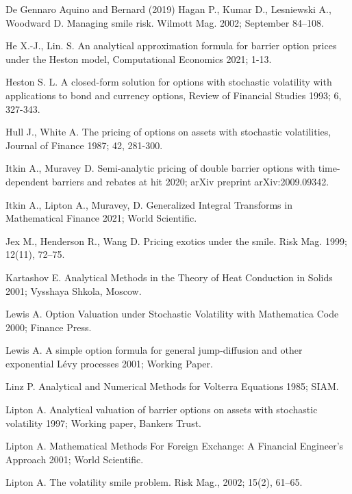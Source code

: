 \documentclass{article}
\begin{document}
\begin{thebibliography}{De Gennaro Aquino and Bernard (2019)}
 Hagan P., Kumar D.,
Lesniewski A., Woodward D. Managing smile risk. Wilmott Mag. 2002; September
84--108.

 He X.-J., Lin. S. An analytical
approximation formula for barrier option prices under the Heston model,
Computational Economics 2021; 1-13.

 Heston S. L. A closed-form solution for
options with stochastic volatility with applications to bond and currency
options, Review of Financial Studies 1993; 6, 327-343.

 Hull J., White A. The pricing of
options on assets with stochastic volatilities, Journal of Finance 1987; 42,
281-300.

 Itkin A., Muravey D.
Semi-analytic pricing of double barrier options with time-dependent barriers
and rebates at hit 2020; arXiv preprint arXiv:2009.09342.

 Itkin A., Lipton A.,
Muravey, D. Generalized Integral Transforms in Mathematical Finance 2021;
World Scientific.

 Jex M., Henderson R., Wang D.
Pricing exotics under the smile. Risk Mag. 1999; 12(11), 72--75.

 Kartashov E. Analytical Methods in
the Theory of Heat Conduction in Solids 2001; Vysshaya Shkola, Moscow.

 Lewis A. Option Valuation under Stochastic
Volatility with Mathematica Code 2000; Finance Press.

 Lewis A. A simple option formula for
general jump-diffusion and other exponential L\'{e}vy processes 2001;
Working Paper.

 Linz P. Analytical and Numerical Methods for
Volterra Equations 1985; SIAM.

 Lipton A. Analytical valuation of
barrier options on assets with stochastic volatility 1997; Working paper,
Bankers Trust.

 Lipton A. Mathematical Methods For
Foreign Exchange: A Financial Engineer's Approach 2001; World Scientific.

 Lipton A. The volatility smile problem.
Risk Mag., 2002; 15(2), 61--65.


\end{thebibliography}
\end{document}
